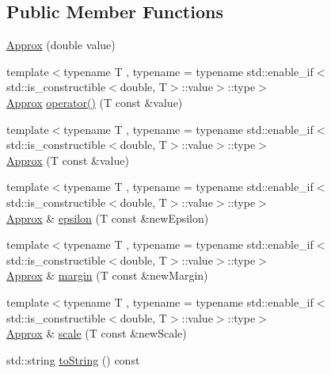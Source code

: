 \subsection*{Public Member Functions}
\begin{DoxyCompactItemize}
\item 
\hyperlink{class_catch_1_1_detail_1_1_approx_a1a8618ea8db08c66bd3d9fe8f74b957a}{Approx} (double value)
\item 
{\footnotesize template$<$typename T , typename  = typename std\-::enable\-\_\-if$<$std\-::is\-\_\-constructible$<$double, T$>$\-::value$>$\-::type$>$ }\\\hyperlink{class_catch_1_1_detail_1_1_approx}{Approx} \hyperlink{class_catch_1_1_detail_1_1_approx_ad8b2757f4804f9a1d3fa674efb98c20e}{operator()} (T const \&value)
\item 
{\footnotesize template$<$typename T , typename  = typename std\-::enable\-\_\-if$<$std\-::is\-\_\-constructible$<$double, T$>$\-::value$>$\-::type$>$ }\\\hyperlink{class_catch_1_1_detail_1_1_approx_ab14b979fa8a37f21d037157fabed4072}{Approx} (T const \&value)
\item 
{\footnotesize template$<$typename T , typename  = typename std\-::enable\-\_\-if$<$std\-::is\-\_\-constructible$<$double, T$>$\-::value$>$\-::type$>$ }\\\hyperlink{class_catch_1_1_detail_1_1_approx}{Approx} \& \hyperlink{class_catch_1_1_detail_1_1_approx_acd26adba86a066b9f40dad467f23bc85}{epsilon} (T const \&new\-Epsilon)
\item 
{\footnotesize template$<$typename T , typename  = typename std\-::enable\-\_\-if$<$std\-::is\-\_\-constructible$<$double, T$>$\-::value$>$\-::type$>$ }\\\hyperlink{class_catch_1_1_detail_1_1_approx}{Approx} \& \hyperlink{class_catch_1_1_detail_1_1_approx_a6467dc18791e1a1f4c15c4fb63cf5051}{margin} (T const \&new\-Margin)
\item 
{\footnotesize template$<$typename T , typename  = typename std\-::enable\-\_\-if$<$std\-::is\-\_\-constructible$<$double, T$>$\-::value$>$\-::type$>$ }\\\hyperlink{class_catch_1_1_detail_1_1_approx}{Approx} \& \hyperlink{class_catch_1_1_detail_1_1_approx_a8f4d2def2920a3840d3271f6d9c5ede2}{scale} (T const \&new\-Scale)
\item 
std\-::string \hyperlink{class_catch_1_1_detail_1_1_approx_adeb74b73506b3f6b2ba72aea15168fbe}{to\-String} () const 
\end{DoxyCompactItemize}
